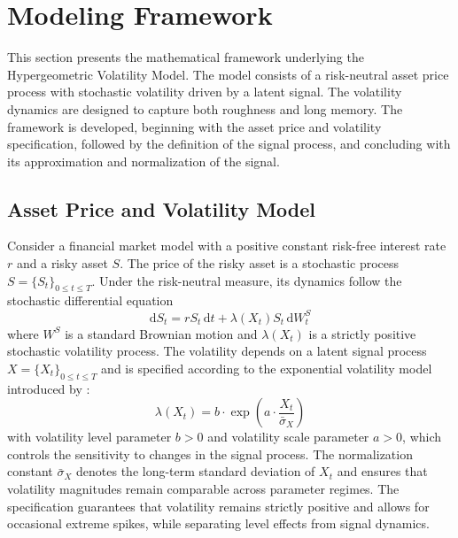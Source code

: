 \section{Modeling Framework} \label{sec:ModFramework}

This section presents the mathematical framework underlying the Hypergeometric Volatility Model. The model consists of a risk-neutral asset price process with stochastic volatility driven by a latent signal. The volatility dynamics are designed to capture both roughness and long memory. The framework is developed, beginning with the asset price and volatility specification, followed by the definition of the signal process, and concluding with its approximation and normalization of the signal.


\subsection{Asset Price and Volatility Model} \label{subsec:AssetPriceVolatilityModel}

Consider a financial market model with a positive constant risk-free interest rate $r$ and a risky asset $S$. The price of the risky asset is a stochastic process $S = \{S_t\}_{0 \leq t \leq T}$. Under the risk-neutral measure, its dynamics follow the stochastic differential equation
\begin{equation} \label{eq:AssetSDE}
    \mathrm{d} S_t = r S_t \,\mathrm{d}t + \lambda(X_t) S_t \,\mathrm{d}W_t^S
\end{equation}
where $W^S$ is a standard Brownian motion and $\lambda(X_t)$ is a strictly positive stochastic volatility process. The volatility depends on a latent signal process $X = \{X_t\}_{0 \leq t \leq T}$ and is specified according to the exponential volatility model introduced by \citet{BennedsenLundePakkanen2021}:
\begin{equation} \label{eq:Volatility}
    \lambda(X_t) = b \cdot \exp \left( a \cdot \frac{X_t}{\bar{\sigma}_X} \right)
\end{equation}
with volatility level parameter $b > 0$ and volatility scale parameter $a > 0$, which controls the sensitivity to changes in the signal process. The normalization constant $\bar{\sigma}_X$ denotes the long-term standard deviation of $X_t$ and ensures that volatility magnitudes remain comparable across parameter regimes. The specification guarantees that volatility remains strictly positive and allows for occasional extreme spikes, while separating level effects from signal dynamics.

